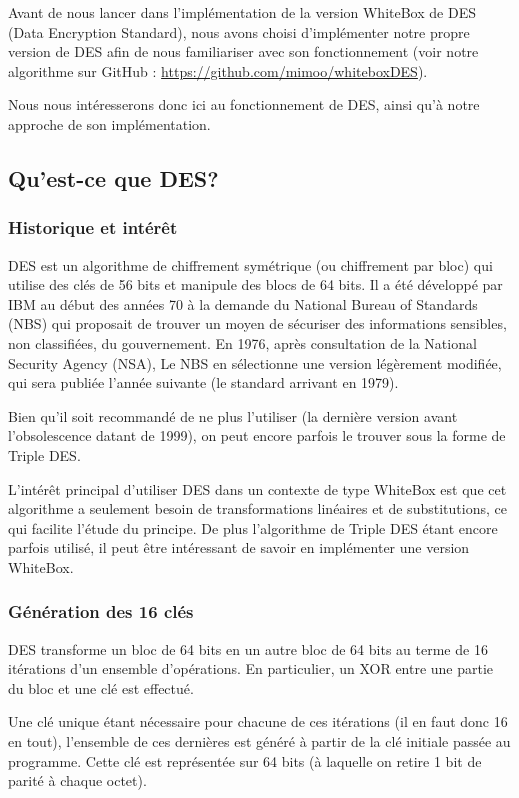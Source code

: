 \documentclass[a4paper,12pt]{article}
\begin{document}
Avant de nous lancer dans l'implémentation de la version WhiteBox de DES (Data Encryption Standard), nous avons choisi d'implémenter notre propre version de DES afin de nous familiariser avec son fonctionnement (voir notre algorithme sur GitHub : \url{https://github.com/mimoo/whiteboxDES}).
	
Nous nous intéresserons donc ici au fonctionnement de DES, ainsi qu'à notre approche de son implémentation.

\subsection{Qu'est-ce que DES?}

\subsubsection{Historique et intérêt}

DES est un algorithme de chiffrement symétrique (ou chiffrement par bloc) qui utilise des clés de 56 bits et manipule des blocs de 64 bits. Il a été développé par IBM au début des années 70 à la demande du National Bureau of Standards (NBS) qui proposait de trouver un moyen de sécuriser des informations sensibles, non classifiées, du gouvernement. En 1976, après consultation de la National Security Agency (NSA), Le NBS en sélectionne une version légèrement modifiée, qui sera publiée l'année suivante (le standard arrivant en 1979).

Bien qu'il soit recommandé de ne plus l'utiliser (la dernière version avant l'obsolescence datant de 1999), on peut encore parfois le trouver sous la forme de Triple DES.
	
L'intérêt principal d'utiliser DES dans un contexte de type WhiteBox est que cet algorithme a seulement besoin de transformations linéaires et de substitutions, ce qui facilite l'étude du principe. De plus l'algorithme de Triple DES étant encore parfois utilisé, il peut être intéressant de savoir en implémenter une version WhiteBox.
	
\subsubsection{Génération des 16 clés}	

DES transforme un bloc de 64 bits en un autre bloc de 64 bits au terme de 16 itérations d'un ensemble d'opérations. En particulier, un XOR entre une partie du bloc et une clé est effectué.

Une clé unique étant nécessaire pour chacune de ces itérations (il en faut donc 16  en tout), l'ensemble de ces dernières est généré à partir de la clé initiale passée au programme. Cette clé est représentée sur 64 bits (à laquelle on retire 1 bit de parité à chaque octet). \\
\end{document}
